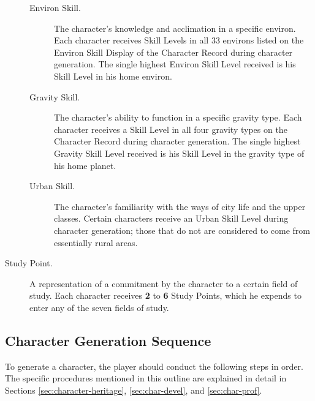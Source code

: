 \begin{description}
  \begin{description}
  \item[Environ Skill.] The character's knowledge and acclimation in a
    specific environ. Each character receives Skill Levels in all 33
    environs listed on the Environ Skill Display of the Character
    Record during character generation. The single highest Environ
    Skill Level received is his Skill Level in his home environ.
  \item[Gravity Skill.] The character's ability to function in a
    specific gravity type. Each character receives a Skill Level in
    all four gravity types on the Character Record during character
    generation. The single highest Gravity Skill Level received is his
    Skill Level in the gravity type of his home planet.
  \item[Urban Skill.] The character's familiarity with the ways of
    city life and the upper classes. Certain characters receive an
    Urban Skill Level during character generation; those that do not
    are considered to come from essentially rural areas.
  \end{description}
  
\item[Study Point.] A representation of a commitment by the character
  to a certain field of study. Each character receives \textbf{2} to
  \textbf{6} Study Points, which he expends to enter any of the seven
  fields of study.
\end{description}




\subsection*{Character Generation Sequence}
\label{sec:char-gener-sequ}



To generate a character, the player should conduct the following steps
in order. The specific procedures mentioned in this outline are
explained in detail in Sections \ref{sec:character-heritage},
\ref{sec:char-devel}, and \ref{sec:char-prof}.

